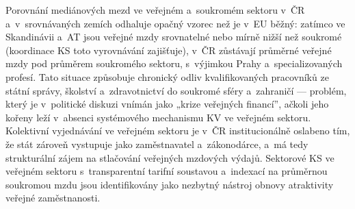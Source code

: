 Porovnání mediánových mezd ve veřejném a~soukromém sektoru v~ČR a~v~srovnávaných zemích odhaluje opačný vzorec než je v~\ac{EU} běžný: zatímco ve Skandinávii a~AT jsou veřejné mzdy srovnatelné nebo mírně nižší než soukromé (koordinace \ac{KS} toto vyrovnávání zajišťuje), v~ČR zůstávají průměrné veřejné mzdy pod průměrem soukromého sektoru, s~výjimkou Prahy a~specializovaných profesí.
Tato situace způsobuje chronický odliv kvalifikovaných pracovníků ze státní správy, školství a~zdravotnictví do soukromé sféry a~zahraničí --- problém, který je v~politické diskuzi vnímán jako „krize veřejných financí”, ačkoli jeho kořeny leží v~absenci systémového mechanismu \ac{KV} ve veřejném sektoru.
Kolektivní vyjednávání ve veřejném sektoru je v~ČR institucionálně oslabeno tím, že stát zároveň vystupuje jako zaměstnavatel a~zákonodárce, a~má tedy strukturální zájem na stlačování veřejných mzdových výdajů.
Sektorové \ac{KS} ve veřejném sektoru s~transparentní tarifní soustavou a~indexací na průměrnou soukromou mzdu jsou identifikovány jako nezbytný nástroj obnovy atraktivity veřejné zaměstnanosti.


